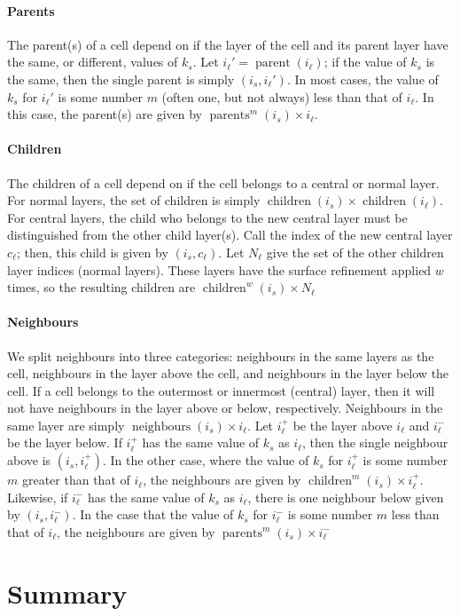 \paragraph{Parents}
The parent(s) of a cell depend on if the layer of the cell and its parent layer have the same, or different, values of $k_s$.
Let $i_\ell' = \operatorname{parent}(i_\ell)$; if the value of $k_s$ is the same, then the single parent is simply $(i_s, i_\ell')$.
In most cases, the value of $k_s$ for $i_\ell'$ is some number $m$ (often one, but not always) less than that of $i_\ell$.
In this case, the parent(s) are given by $\operatorname{parents}^m(i_s) \times i_\ell$.


\paragraph{Children} The children of a cell depend on if the cell belongs to a central or normal layer.
For normal layers, the set of children is simply $\operatorname{children}(i_s) \times \operatorname{children}(i_\ell)$.
For central layers, the child who belongs to the new central layer must be distinguished from the other child layer(s).
Call the index of the new central layer $c_\ell$; then, this child is given by $(i_s, c_\ell)$.
Let $ N_\ell$ give the set of the other children layer indices (normal layers).
These layers have the surface refinement applied $w$ times, so the resulting children are $\operatorname{children}^w(i_s) \times N_\ell$


\paragraph{Neighbours} We split neighbours into three categories: neighbours in the same layers as the cell, neighbours in the layer above the cell, and neighbours in the layer below the cell.
If a cell belongs to the outermost or innermost (central) layer, then it will not have neighbours in the layer above or below, respectively.
Neighbours in the same layer are simply $\operatorname{neighbours}(i_s) \times i_\ell$.
Let $i_\ell^+$ be the layer above $i_\ell$ and $i_\ell^-$ be the layer below.
If $i_\ell^+$ has the same value of $k_s$ as $i_\ell$, then the single neighbour above is $(i_s, i_\ell^+)$.
In the other case, where the value of $k_s$ for $i_\ell^+$ is some number $m$ greater than that of $i_\ell$, the neighbours are given by $\operatorname{children}^m(i_s) \times i_\ell^+$.
Likewise, if $i_\ell^-$ has the same value of $k_s$ as $i_\ell$, there is one neighbour below given by $(i_s, i_\ell^-)$.
In the case that the value of $k_s$ for $i_\ell^-$ is some number $m$ less than that of $i_\ell$, the neighbours are given by $\operatorname{parents}^m(i_s) \times i_\ell^-$

\section{Summary}